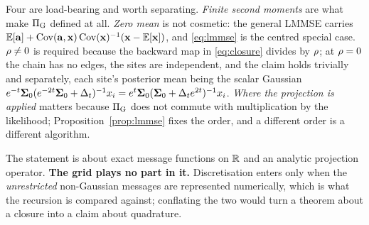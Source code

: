 
\begin{remark}
\label{rem:lmmse-hyp}
Four are load-bearing and worth separating. \emph{Finite second moments} are what make $\Pi_{\mathrm{G}}$
defined at all. \emph{Zero mean} is not cosmetic: the general LMMSE carries
$\mathbb{E}[\mathbf{a}] + \operatorname{Cov}(\mathbf{a},\mathbf{x})\operatorname{Cov}(\mathbf{x})^{-1}(\mathbf{x}-\mathbb{E}[\mathbf{x}])$, and \eqref{eq:lmmse} is the centred
special case. \emph{$\rho\neq0$} is required because the backward map in \eqref{eq:closure}
divides by $\rho$; at $\rho=0$ the chain has no edges, the sites are independent, and the
claim holds trivially and separately, each site's posterior mean being the scalar Gaussian
$e^{-t}\mathbf{\Sigma}_0(e^{-2t}\mathbf{\Sigma}_0+\Delta_t)^{-1}x_i = e^{t}\mathbf{\Sigma}_0(\mathbf{\Sigma}_0+\Delta_t e^{2t})^{-1}x_i$. \emph{Where the projection is applied} matters because
$\Pi_{\mathrm{G}}$ does not commute with multiplication by the likelihood; Proposition~\ref{prop:lmmse}
fixes the order, and a different order is a different algorithm.

The statement is about exact message functions on $\mathbb{R}$ and an analytic projection operator.
\textbf{The grid plays no part in it.} Discretisation enters only when the \emph{unrestricted}
non-Gaussian messages are represented numerically, which is what the recursion is compared
against; conflating the two would turn a theorem about a closure into a claim about quadrature.
\end{remark}

